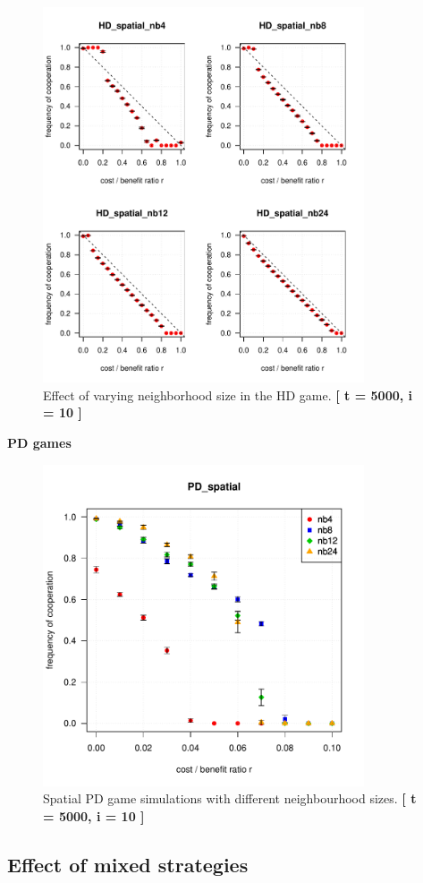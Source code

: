 \begin{figure}
	\centering 
	\includegraphics[width=9.5cm]{task2_4plot}
	\caption{Effect of varying neighborhood size in the HD game.  \textbf{[ t = 5000, i = 10 ]} }\label{fig: task2_4plot}
\end{figure}



\textbf{PD games} 


\begin{figure}[H]
	\centering 
	\includegraphics[width=9.5cm]{task2_multiplot}
	\caption{Spatial PD game simulations with different neighbourhood sizes.  \textbf{[ t = 5000, i = 10 ]} }\label{fig: task2_multiplot}
\end{figure}





\subsection{Effect of mixed strategies}

